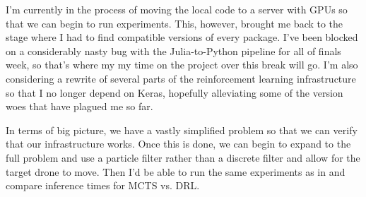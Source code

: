 \documentclass{article}
\begin{document}
I'm currently in the process of moving the local code to a server with GPUs so that we can begin to run experiments.
This, however, brought me back to the stage where I had to find compatible versions of every package.
I've been blocked on a considerably nasty bug with the Julia-to-Python pipeline for all of finals week, so that's where my my time on the project over this break will go.
I'm also considering a rewrite of several parts of the reinforcement learning infrastructure so that I no longer depend on Keras, hopefully alleviating some of the version woes that have plagued me so far.

In terms of big picture, we have a vastly simplified problem so that we can verify that our infrastructure works. 
Once this is done, we can begin to expand to the full problem and use a particle filter rather than a discrete filter and allow for the target drone to move.
Then I'd be able to run the same experiments as in \cite{dronehunter} and compare inference times for MCTS vs. DRL.




\end{document}
